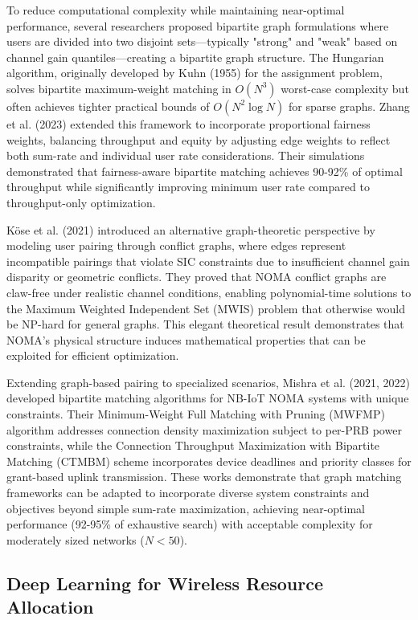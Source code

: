 To reduce computational complexity while maintaining near-optimal performance, several researchers proposed bipartite graph formulations where users are divided into two disjoint sets—typically "strong" and "weak" based on channel gain quantiles—creating a bipartite graph structure. The Hungarian algorithm, originally developed by Kuhn (1955) for the assignment problem, solves bipartite maximum-weight matching in $O(N^3)$ worst-case complexity but often achieves tighter practical bounds of $O(N^2 \log N)$ for sparse graphs. Zhang et al. (2023) extended this framework to incorporate proportional fairness weights, balancing throughput and equity by adjusting edge weights to reflect both sum-rate and individual user rate considerations. Their simulations demonstrated that fairness-aware bipartite matching achieves 90-92\% of optimal throughput while significantly improving minimum user rate compared to throughput-only optimization.

Köse et al. (2021) introduced an alternative graph-theoretic perspective by modeling user pairing through conflict graphs, where edges represent incompatible pairings that violate SIC constraints due to insufficient channel gain disparity or geometric conflicts. They proved that NOMA conflict graphs are claw-free under realistic channel conditions, enabling polynomial-time solutions to the Maximum Weighted Independent Set (MWIS) problem that otherwise would be NP-hard for general graphs. This elegant theoretical result demonstrates that NOMA's physical structure induces mathematical properties that can be exploited for efficient optimization.

Extending graph-based pairing to specialized scenarios, Mishra et al. (2021, 2022) developed bipartite matching algorithms for NB-IoT NOMA systems with unique constraints. Their Minimum-Weight Full Matching with Pruning (MWFMP) algorithm addresses connection density maximization subject to per-PRB power constraints, while the Connection Throughput Maximization with Bipartite Matching (CTMBM) scheme incorporates device deadlines and priority classes for grant-based uplink transmission. These works demonstrate that graph matching frameworks can be adapted to incorporate diverse system constraints and objectives beyond simple sum-rate maximization, achieving near-optimal performance (92-95\% of exhaustive search) with acceptable complexity for moderately sized networks ($N < 50$).

\subsection{Deep Learning for Wireless Resource Allocation}

